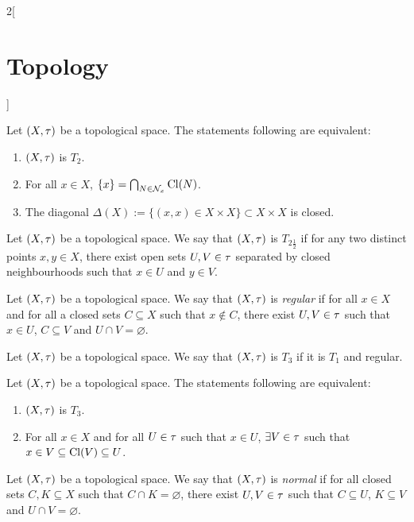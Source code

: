 \documentclass[../../../main.tex]{subfiles}
\begin{document}
\begin{multicols}{2}[\section{Topology}]
\begin{theorem}
        Let $(X,\tau)$ be a topological space. The statements following are equivalent:
        \begin{enumerate}
            \item $(X,\tau)$ is $T_2$.
            \item For all $x\in X$, $\{x\}=\bigcap_{N\in \mathcal{N}_x}\operatorname{Cl}(N)$.
            \item The diagonal $\Delta(X):=\{(x,x)\in X\times X\}\subset X\times X$ is closed.
        \end{enumerate}
    \end{theorem}
    \begin{definition}
        Let $(X,\tau)$ be a topological space. We say that $(X,\tau)$ is $T_{2\frac{1}{2}}$ if for any two distinct points $x,y\in X$, there exist open sets $U,V\in\tau$ separated by closed neighbourhoods such that $x\in U$ and $y\in V$.
    \end{definition}
    \begin{definition}
        Let $(X,\tau)$ be a topological space. We say that $(X,\tau)$ is \emph{regular} if for all $x\in X$ and for all a closed sets $C\subseteq X$ such that $x\notin C$, there exist $U,V\in\tau$ such that $x\in U$, $C\subseteq V$ and $U\cap V=\varnothing$.
    \end{definition}
    \begin{definition}[$T_3$ space]
        Let $(X,\tau)$ be a topological space. We say that $(X,\tau)$ is $T_3$ if it is $T_1$ and regular.
    \end{definition}
    \begin{theorem}
        Let $(X,\tau)$ be a topological space. The statements following are equivalent:
        \begin{enumerate}
            \item $(X,\tau)$ is $T_3$.
            \item For all $x\in X$ and for all $U\in\tau$ such that $x\in U$, $\exists V\in\tau$ such that $x\in V\subseteq\operatorname{Cl}(V)\subseteq U$.
        \end{enumerate}
    \end{theorem}
    \begin{definition}
        Let $(X,\tau)$ be a topological space. We say that $(X,\tau)$ is \emph{normal} if for all closed sets $C,K\subseteq X$ such that $C\cap K=\varnothing$, there exist $U,V\in\tau$ such that $C\subseteq U$, $K\subseteq V$ and $U\cap V=\varnothing$.
    \end{definition}

\end{multicols}
\end{document}
